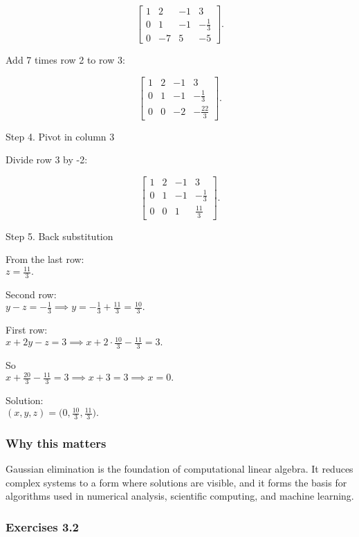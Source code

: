 \documentclass[
  12pt,
  a4paper,
]{article}
\begin{document}
\[\left[\begin{array}{ccc|c}
1 & 2 & -1 & 3 \\
0 & 1 & -1 & -\tfrac{1}{3} \\
0 & -7 & 5 & -5
\end{array}\right].\]

Add 7 times row 2 to row 3:

\[\left[\begin{array}{ccc|c}
1 & 2 & -1 & 3 \\
0 & 1 & -1 & -\tfrac{1}{3} \\
0 & 0 & -2 & -\tfrac{22}{3}
\end{array}\right].\]

Step 4. Pivot in column 3

Divide row 3 by -2:

\[\left[\begin{array}{ccc|c}
1 & 2 & -1 & 3 \\
0 & 1 & -1 & -\tfrac{1}{3} \\
0 & 0 & 1 & \tfrac{11}{3}
\end{array}\right].\]

Step 5. Back substitution

From the last row:\\
\(
z = \tfrac{11}{3}.
\)

Second row:\\
\(
y - z = -\tfrac{1}{3} \implies y = -\tfrac{1}{3} + \tfrac{11}{3} = \tfrac{10}{3}.
\)

First row:\\
\(
x + 2y - z = 3 \implies x + 2\cdot\tfrac{10}{3} - \tfrac{11}{3} = 3.
\)

So\\
\(
x + \tfrac{20}{3} - \tfrac{11}{3} = 3 \implies x + 3 = 3 \implies x = 0.
\)

Solution:\\
\(
(x,y,z) = \big(0, \tfrac{10}{3}, \tfrac{11}{3}\big).
\)

\subsubsection{Why this matters}\label{why-this-matters-9}

Gaussian elimination is the foundation of computational linear algebra.
It reduces complex systems to a form where solutions are visible, and it
forms the basis for algorithms used in numerical analysis, scientific
computing, and machine learning.

\subsubsection{Exercises 3.2}\label{exercises-32}
\end{document}
